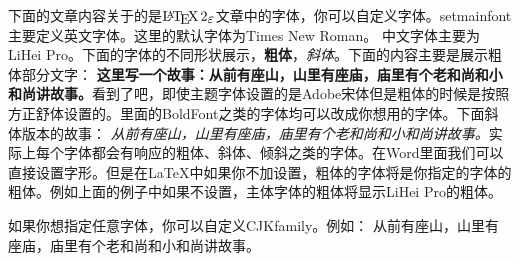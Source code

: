 \documentclass{article}
\newcommand{\hwhp}{\CJKfamily{hwhp}}
\begin{document}
下面的文章内容关于的是$\LaTeXe$文章中的字体，你可以自定义字体。setmainfont主要定义英文字体。这里的默认字体为Times New Roman。
中文字体主要为LiHei Pro。下面的字体的不同形状展示，\textbf{粗体}，\textit{斜体}。下面的内容主要是展示粗体部分文字：
\textbf{这里写一个故事：从前有座山，山里有座庙，庙里有个老和尚和小和尚讲故事。}看到了吧，即使主题字体设置的是Adobe宋体但是粗体的时候是按照方正舒体设置的。里面的BoldFont之类的字体均可以改成你想用的字体。下面斜体版本的故事：
\textit{从前有座山，山里有座庙，庙里有个老和尚和小和尚讲故事。}实际上每个字体都会有响应的粗体、斜体、倾斜之类的字体。在Word里面我们可以直接设置字形。但是在LaTeX中如果你不加设置，粗体的字体将是你指定的字体的粗体。例如上面的例子中如果不设置，主体字体的粗体将显示LiHei Pro的粗体。

如果你想指定任意字体，你可以自定义CJKfamily。例如：
{\hwhp 从前有座山，山里有座庙，庙里有个老和尚和小和尚讲故事。}
\end{document}

